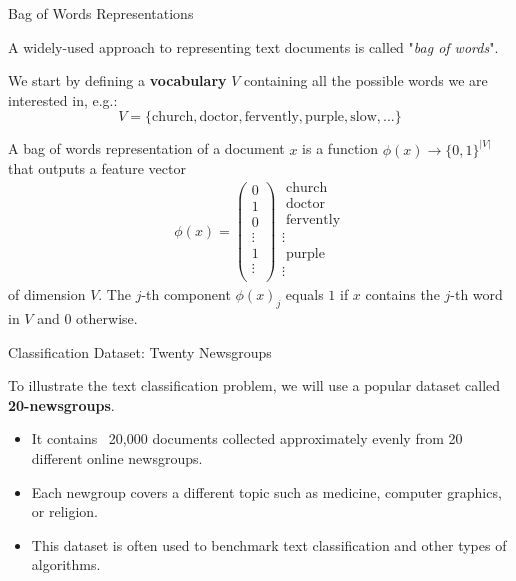 \documentclass[../../main.tex]{subfiles}
\begin{document}
\begin{frame}[fragile]{Bag of Words Representations}



A widely-used approach to representing text documents is called "\textit{bag of words}".

We start by defining a \textbf{vocabulary} $V$ containing all the possible words we are interested in, e.g.:
$$ V = \{\text{church}, \text{doctor}, \text{fervently}, \text{purple}, \text{slow}, ...\} $$

A bag of words representation of a document $x$ is a function $\phi(x) \to \{0,1\}^{|V|}$ that outputs a feature vector
$$
\phi(x) = \left( 
\begin{array}{c}
0 \\
1 \\
0 \\
\vdots \\
1 \\
\vdots \\
\end{array}
\right)
\begin{array}{l}
\;\text{church} \\
\;\text{doctor} \\
\;\text{fervently} \\
\vdots \\
\;\text{purple} \\
\vdots \\
\end{array}
$$
of dimension $V$. The $j$-th component $\phi(x)_j$ equals $1$ if $x$ contains the $j$-th word in $V$ and $0$ otherwise.


\end{frame}

\begin{frame}[fragile]{Classification Dataset: Twenty Newsgroups}

To illustrate the text classification problem, we will use a popular dataset called \textbf{20-newsgroups}. 
\begin{itemize}
    \item It contains ~20,000 documents collected approximately evenly from 20 different online newsgroups.
    \item Each newgroup covers a different topic such as medicine, computer graphics, or religion.
    \item This dataset is often used to benchmark text classification and other types of algorithms.
\end{itemize}


\end{frame}
\end{document}
